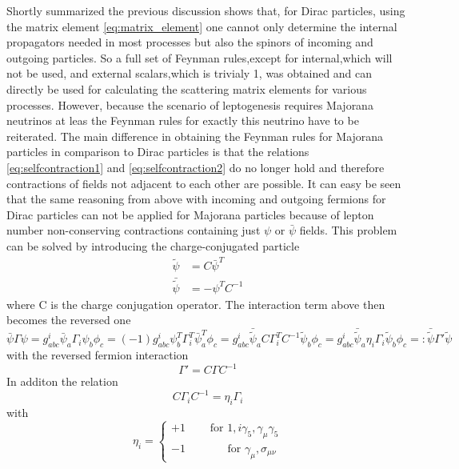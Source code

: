 Shortly summarized the previous discussion shows that, for Dirac particles, using the matrix element \ref{eq:matrix_element} one cannot only determine the internal propagators needed in most processes but also the spinors of incoming and outgoing particles. So a full set of Feynman rules,except for internal,which will not be used, and external scalars,which is trivialy 1, was obtained and can directly be used for calculating the scattering matrix elements for various processes. \newline
However, because the scenario of leptogenesis requires Majorana neutrinos at leas the Feynman rules for exactly this neutrino have to be reiterated. The main difference in obtaining the Feynman rules for Majorana particles in comparison to Dirac particles is that the relations \ref{eq:selfcontraction1} and \ref{eq:selfcontraction2} do no longer hold and therefore contractions of fields not adjacent to each other are possible. It can easy be seen that the same reasoning from above with incoming and outgoing fermions for Dirac particles can not be applied for Majorana particles because of lepton number non-conserving contractions containing just $\psi$ or $\bar{\psi}$ fields.\newline
This problem can be solved by introducing the charge-conjugated particle 
\begin{align*}
	\tilde{\psi}&=C\bar{\psi}^T\\
	\bar{\tilde{\psi}}&=-\psi^T C^{-1}
\end{align*}
where C is the charge conjugation operator. The interaction term above then becomes the reversed one
\begin{equation*}
		\bar{\psi}\Gamma\psi=g^i_{abc}\bar{\psi}_a\Gamma_i\psi_b\phi_c=(-1)g^i_{abc}\psi_b^T\Gamma_i^T\bar{\psi}_a^T\phi_c=g^i_{abc}\bar{\tilde{\psi}}_aC\Gamma_i^TC^{-1}\tilde{\psi}_b\phi_c=g^i_{abc}\bar{\tilde{\psi}}_a\eta_i\Gamma_i\tilde{\psi}_b\phi_c=:\bar{\tilde{\psi}}\Gamma'\tilde{\psi}
\end{equation*}
with the reversed fermion interaction
\begin{equation*}
	\Gamma'=C\Gamma C^{-1}
\end{equation*}
In additon the relation
\begin{equation*}
	C\Gamma_i C^{-1}=\eta_i\Gamma_i
\end{equation*}
with 
\begin{equation*}
	\eta_i=\left\{\begin{array}{c}+1\:\:\:\:\:\:\:\:\:\:\text{for } 1,i\gamma_5,\gamma_\mu\gamma_5\\-1\:\:\:\:\:\:\:\:\:\:\:\:\:\:\:\:\:\text{for }\gamma_\mu,\sigma_{\mu\nu}\end{array}\right.
\end{equation*}

